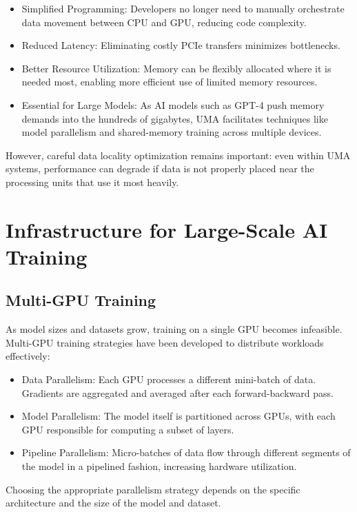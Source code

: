 \documentclass[openany]{book}
\begin{document}
\begin{itemize}
    \item Simplified Programming: Developers no longer need to manually 
    orchestrate data movement between CPU and GPU, reducing code complexity.
    \item Reduced Latency: Eliminating costly PCIe transfers minimizes 
    bottlenecks.
    \item Better Resource Utilization: Memory can be flexibly allocated where it 
    is needed most, enabling more efficient use of limited memory resources.
    \item Essential for Large Models: As AI models such as GPT-4 push memory 
    demands into the hundreds of gigabytes, UMA facilitates techniques like 
    model parallelism and shared-memory training across multiple devices.
\end{itemize}

However, careful data locality optimization remains important: even within UMA 
systems, performance can degrade if data is not properly placed near the 
processing units that use it most heavily.

\section{Infrastructure for Large-Scale AI Training}

\subsection{Multi-GPU Training}
As model sizes and datasets grow, training on a single GPU becomes infeasible. 
Multi-GPU training strategies have been developed to distribute workloads 
effectively:

\begin{itemize}
    \item Data Parallelism: Each GPU processes a different mini-batch of data. 
    Gradients are aggregated and averaged after each forward-backward pass.
    \item Model Parallelism: The model itself is partitioned across GPUs, with 
    each GPU responsible for computing a subset of layers.
    \item Pipeline Parallelism: Micro-batches of data flow through different 
    segments of the model in a pipelined fashion, increasing hardware 
    utilization.
\end{itemize}

Choosing the appropriate parallelism strategy depends on the specific 
architecture and the size of the model and dataset.
\end{document}
